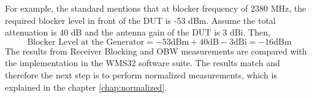 For example, the standard mentions that at blocker frequency of 2380 MHz, the required blocker level in front of the \acs{DUT} is -53 dBm. Assume the total attenuation is 40 dB and the antenna gain of the \acs{DUT} is 3 dBi. Then,
$$\mbox{Blocker Level at the Generator} = -53 \mbox{dBm} + 40 \mbox{dB}- 3 \mbox{dBi} = -16 \mbox{dBm}$$ 
The results from Receiver Blocking and \acf{OBW} measurements are compared with the implementation in the WMS32 software suite. The results match and therefore the next step is to perform normalized measurements, which is explained in the chapter \ref{chap:normalized}.






